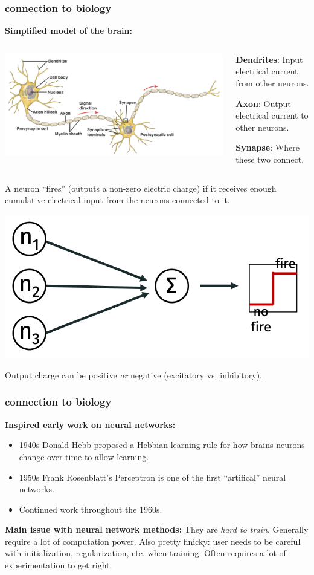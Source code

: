 \documentclass[handout,compress]{beamer}
\begin{document}
\begin{frame}
	\frametitle{connection to biology}
	\small
	\textbf{Simplified model of the brain:}
	\begin{columns}
		\begin{column}{.55\textwidth}
			\includegraphics[width=\textwidth]{neurons.png}
		\end{column}
		\begin{column}{.45\textwidth}
			\textbf{Dendrites}: Input electrical current from other neurons.
			
			\textbf{Axon}: Output electrical current to other neurons.
			
			\textbf{Synapse}: Where these two connect.
		\end{column}
	\end{columns}
	A neuron ``fires'' (outputs a non-zero electric charge) if it receives enough cumulative electrical input from the neurons connected to it. 
	\begin{center}
		\includegraphics[width=.4\textwidth]{neural_model.png}
	\end{center}
	Output charge can be positive \emph{or} negative (excitatory vs. inhibitory). 
\end{frame}

\begin{frame}
	\frametitle{connection to biology}
	\textbf{Inspired early work on neural networks:}
	\begin{itemize}
		\item 1940s Donald Hebb proposed a Hebbian learning rule for how brains neurons change over time to allow learning.
		\item 1950s Frank Rosenblatt's Perceptron is one of the first ``artifical'' neural networks.
		\item Continued work throughout the 1960s. 
	\end{itemize}
\textbf{Main issue with neural network methods:} They are \emph{hard to train}. Generally require a lot of computation power. Also pretty finicky: user needs to be careful with initialization, regularization, etc. when training.  Often requires a lot of experimentation to get right.
\end{frame}
\end{document}
